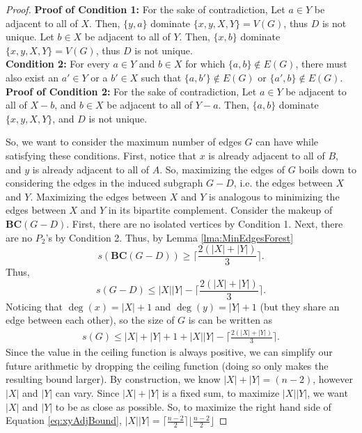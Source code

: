\documentclass[12pt]{amsart}
\begin{document}
\begin{proof}
\textbf{Proof of Condition 1:} For the sake of contradiction, Let $a \in Y$ be adjacent to all of $X$. Then, $\{y,a\}$ dominate $\{x,y,X,Y\} = V(G)$, thus $D$ is not unique. Let $b \in X$ be adjacent to all of $Y$. Then, $\{x,b\}$ dominate $\{x,y,X,Y\} = V(G)$, thus $D$ is not unique.\\
\textbf{Condition 2:} For every $a \in Y$ and $b \in X$ for which $\{a,b\} \notin E(G)$, there must also exist an $a' \in Y$  or a $b' \in X$ such that $\{a,b'\} \notin E(G)$ or $\{a',b\} \notin E(G)$.\\
\textbf{Proof of Condition 2:} For the sake of contradiction, Let $a \in Y$ be adjacent to all of $X - b$, and $b \in X$ be adjacent to all of $Y - a$. Then, $\{a,b\}$ dominate $\{x,y,X,Y\}$, and $D$ is not unique.

So, we want to consider the maximum number of edges $G$ can have while satisfying these conditions. First, notice that $x$ is already adjacent to all of $B$, and $y$ is already adjacent to all of $A$. So, maximizing the edges of $G$ boils down to considering the edges in the induced subgraph $G-D$, i.e. the edges between $X$ and $Y$. Maximizing the edges between $X$ and $Y$ is analogous to minimizing the edges between $X$ and $Y$ in its bipartite complement. Consider the makeup of $\mathbf{BC}(G -D)$. First, there are no isolated vertices by Condition 1. Next, there are no $P_2$'s by Condition 2. Thus, by Lemma \ref{lma:MinEdgesForest} $$s(\mathbf{BC}(G-D)) \geq \bigg\lceil \frac{2(|X| + |Y|)}{3}\bigg\rceil.$$ Thus, $$s(G-D) \leq |X||Y| - \bigg\lceil \frac{2(|X| + |Y|)}{3}\bigg\rceil.$$
Noticing that $\deg(x) = |X| + 1$ and $\deg(y) = |Y| + 1$ (but they share an edge between each other), so the size of $G$ is can be written as 
\begin{align}\label{eq:xyAdjBound}
    s(G) \leq |X| + |Y| + 1 + |X||Y| - \bigg\lceil \frac{2(|X| + |Y|)}{3}\bigg\rceil.
\end{align}
Since the value in the ceiling function is always positive, we can simplify our future arithmetic by dropping the ceiling function (doing so only makes the resulting bound larger). By construction, we know $|X| + |Y| = (n-2)$, however $|X|$ and $|Y|$ can vary. Since $|X| + |Y|$ is a fixed sum, to maximize $|X||Y|$, we want $|X|$ and $|Y|$ to be as close as possible. So, to maximize the right hand side of Equation \ref{eq:xyAdjBound}, $|X||Y| = \lceil\frac{n-2}{2}\rceil\lfloor\frac{n-2}{2}\rfloor$


\end{proof}
\end{document}
